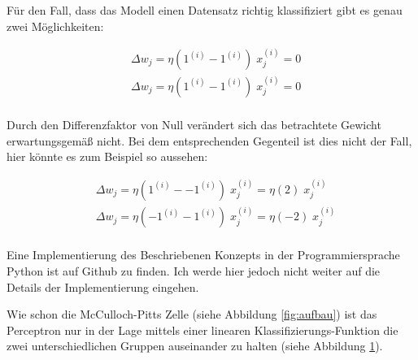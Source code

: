 Für den Fall, dass das Modell einen Datensatz richtig klassifiziert gibt es genau zwei Möglichkeiten: 

\begin{equation}
\begin{aligned}
& \Delta w_j = \eta(1^{(i)} - 1^{(i)})\;x^{(i)}_{j} = 0 \\
& \Delta w_j = \eta(1^{(i)} - 1^{(i)})\;x^{(i)}_{j} = 0 \\
\end{aligned}
\end{equation}

Durch den Differenzfaktor von Null verändert sich das betrachtete Gewicht erwartungsgemäß nicht. Bei dem entsprechenden Gegenteil ist dies nicht der Fall, hier könnte es zum Beispiel so aussehen: 

\begin{equation}
\begin{aligned}
& \Delta w_j = \eta(1^{(i)} - -1^{(i)})\;x^{(i)}_{j} = \eta(2)\;x^{(i)}_{j} \\
& \Delta w_j = \eta(-1^{(i)} - 1^{(i)})\;x^{(i)}_{j} = \eta(-2)\;x^{(i)}_{j} \\
\end{aligned}
\end{equation}

Eine Implementierung des Beschriebenen Konzepts in der Programmiersprache Python ist auf Github \cite{pcImplementierung} zu finden. Ich werde hier jedoch nicht weiter auf die Details der Implementierung eingehen. 

Wie schon die McCulloch-Pitts Zelle (siehe Abbildung \ref{fig:aufbau}) ist das Perceptron nur in der Lage mittels einer linearen Klassifizierungs-Funktion die zwei unterschiedlichen Gruppen auseinander zu halten (siehe Abbildung \ref{fig:probKlassi}).


\begin{figure}%
  \centering
  \qquad
  \label{fig:probKlassi}
\end{figure}